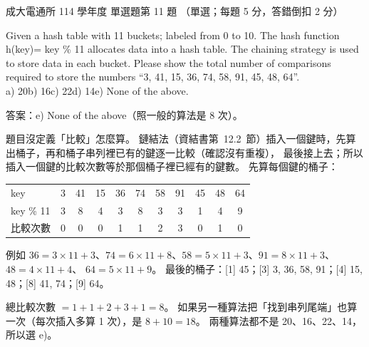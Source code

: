 \begin{pastexam}[label={px:ncku-114-cce-ds-11}]{成大電通所 114 學年度 單選題第 11 題}
（單選；每題 5 分，答錯倒扣 2 分）

Given a hash table with 11 buckets; labeled from 0 to 10. The hash function h(key)= key \% 11 allocates data
into a hash table. The chaining strategy is used to store data in each bucket. Please show the total number of
comparisons required to store the numbers ``3, 41, 15, 36, 74, 58, 91, 45, 48, 64''.\\
a) 20\quad b) 16\quad c) 22\quad d) 14\quad e) None of the above.
\end{pastexam}

\begin{pastsoln}
答案：e) None of the above（照一般的算法是 8 次）。

題目沒定義「比較」怎麼算。 鏈結法（資結書第~12.2~節）插入一個鍵時，先算出桶子，再和桶子串列裡已有的鍵逐一比較（確認沒有重複），
最後接上去；所以插入一個鍵的比較次數等於那個桶子裡已經有的鍵數。 先算每個鍵的桶子：
\begin{center}
\begin{tabular}{l*{10}{c}}
\toprule
key & 3 & 41 & 15 & 36 & 74 & 58 & 91 & 45 & 48 & 64 \\
key \% 11 & 3 & 8 & 4 & 3 & 8 & 3 & 3 & 1 & 4 & 9 \\
比較次數 & 0 & 0 & 0 & 1 & 1 & 2 & 3 & 0 & 1 & 0 \\
\bottomrule
\end{tabular}
\end{center}
例如 $36 = 3 \times 11 + 3$、$74 = 6 \times 11 + 8$、$58 = 5 \times 11 + 3$、$91 = 8 \times 11 + 3$、$48 = 4 \times 11 + 4$、
$64 = 5 \times 11 + 9$。 最後的桶子：[1] 45；[3] 3, 36, 58, 91；[4] 15, 48；[8] 41, 74；[9] 64。

總比較次數 $= 1 + 1 + 2 + 3 + 1 = 8$。 如果另一種算法把「找到串列尾端」也算一次（每次插入多算 1 次），是 $8 + 10 = 18$。
兩種算法都不是 20、16、22、14，所以選 e)。
\end{pastsoln}
